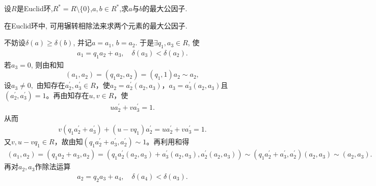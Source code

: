 \documentclass[../../main.tex]{subfiles}%
\begin{document}
\begin{proposition}[辗转相除法]
设$R$是Euclid环,$R^*=R\setminus \{0\}$,$a,b\in R^*$,求$a$与$b$的最大公因子.
\end{proposition}
\begin{note}
在Euclid环中, 可用辗转相除法来求两个元素的最大公因子.
\end{note}
\begin{solution}

不妨设$\delta(a)\geqslant\delta(b)$, 并记$a=a_1$, $b=a_2$. 于是$\exists q_1,a_3\in R$, 使
\begin{align*}
a_1=q_1a_2+a_3,\quad \delta(a_3)<\delta(a_2).
\end{align*}
若$a_3=0$, 则由和知
$$
(a_1,a_2)=\left( q_1a_2,a_2 \right) =\left( q_1,1 \right) a_2\sim a_2,
$$
设$a_3\neq 0,$
由知存在$a_{2}^{\prime},a_{3}^{\prime}\in R$，使$a_2=a_{2}^{\prime}(a_2,a_3)$，$a_3=a_{3}^{\prime}(a_2,a_3)$且$(a_{2}^{\prime},a_{3}^{\prime})=1$。再由知存在$u,v\in R$，使
\begin{align*}
ua_{2}^{\prime}+va_{3}^{\prime}=1.
\end{align*}
从而
\begin{align*}
v(q_1a_{2}^{\prime}+a_{3}^{\prime})+(u-vq_1)a_{2}^{\prime}=ua_{2}^{\prime}+va_{3}^{\prime}=1.
\end{align*}
又$v,u-vq_1\in R$，故由知$(q_1a_{2}^{\prime}+a_{3}^{\prime},a_{2}^{\prime})\sim 1$。再利用和得
\begin{align*}
(a_1,a_2)=(q_1a_2+a_3,a_2)=(q_1a_{2}^{\prime}(a_2,a_3)+a_{3}^{\prime}(a_2,a_3),a_{2}^{\prime}(a_2,a_3))\sim (q_1a_{2}^{\prime}+a_{3}^{\prime},a_{2}^{\prime})(a_2,a_3)\sim (a_2,a_3).
\end{align*}
再对$a_2,a_3$作除法运算
\begin{align*}
a_2=q_2a_3+a_4,\quad \delta(a_4)<\delta(a_3).
\end{align*}


\end{solution}
\end{document}
